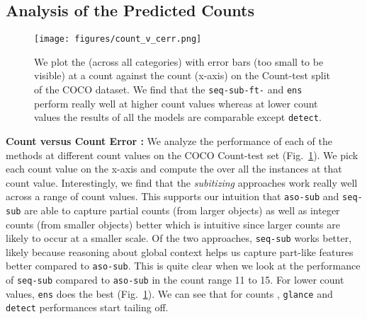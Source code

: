 \documentclass[10pt,twocolumn,letterpaper]{article}
\newcommand{\detect}{\texttt{detect}\xspace}
\newcommand{\sub}{\texttt{aso-sub}\xspace}
\newcommand{\seq}{\texttt{seq-sub}\xspace}
\newcommand{\glance}{\texttt{glance}\xspace}
\newcommand{\ens}{\texttt{ens}\xspace}
\begin{document}
\subsection{Analysis of the Predicted Counts} 
\begin{figure}[t]
\centering     \texttt{[image: figures/count\_v\_cerr.png]}
\vspace{-20pt}
\caption{\footnotesize{We plot the  (across all categories) with error bars (too small to be visible) at a count against the count (x-axis) on the Count-test split of the COCO dataset. We find that the \seq{}\texttt{-ft-} and \ens perform really well at higher count values whereas at lower count values the results of all the models are comparable except \detect.}}
\label{fig:a}
\vspace{-18pt}
\end{figure}
\par \noindent
\textbf{Count versus Count Error : } We analyze the performance of each of the methods at different count values on the COCO Count-test set (Fig.~\ref{fig:a}). 
We pick each count value on the x-axis and compute the  over all the instances at that count value. Interestingly, we find that the \emph{subitizing} approaches work really well across a range of count values. This supports our intuition that \sub and \seq are able to capture partial counts (from larger objects) as well as integer counts (from smaller objects) better which is intuitive since larger counts are likely to occur at a smaller scale. Of the two approaches, \seq works better, likely because reasoning about global context helps us capture part-like features better compared to \sub. This is quite clear when we look at the performance of \seq compared to \sub in the count range 11 to 15. For lower count values, \ens does the best (Fig.~\ref{fig:a}). We can see that for counts , \glance and \detect performances start tailing off. 







\begin{comment}

\begin{figure}[t]
\texttt{[image: figures/detection\_qualitative]}
\caption{We show the ground truth count (first col.), outputs of \detect{} with a default threshold of 0.8 (second col.), and outputs of \detect{} with hyperparameters tuned for counting (third col.). We can see that choosing a different threshold allows us to trade-off localization accuracy for counting accuracy (see bottle image). Thus, the method finds partial evidence for counts, even if it cannot localize the full object.}
\label{fig:qual_det}
\vspace{-10pt}
\end{figure}

\end{comment}
\end{document}
